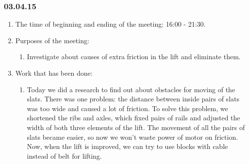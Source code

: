 \subsubsection{03.04.15}
\begin{enumerate}
	
	\item The time of beginning and ending of the meeting: 16:00 - 21:30.
	
	\item Purposes of the meeting: 
	\begin{enumerate}
		
		\item Investigate about causes of extra friction in the lift and eliminate them.
		
	\end{enumerate}

	\item Work that has been done:
	\begin{enumerate}
		
		\item Today we did a research to find out about obstacles for moving of the slats. There was one problem: the distance between inside pairs of slats was too wide and caused a lot of friction. To solve this problem, we shortened the ribs and axles, which fixed pairs of rails and adjusted the width of both three elements of the lift. The movement of all the pairs of slats became easier, so now we won't waste power of motor on friction. Now, when the lift is improved, we can try to use blocks with cable instead of belt for lifting.
        \begin{figure}[H]
	  	  \begin{minipage}[h]{0.2\linewidth}
	  	    \center  
	  	  \end{minipage}
	  	  \begin{minipage}[h]{0.6\linewidth}
	  		\caption{}
	  	  \end{minipage}
	   \end{figure}


\end{enumerate}
\end{enumerate}
